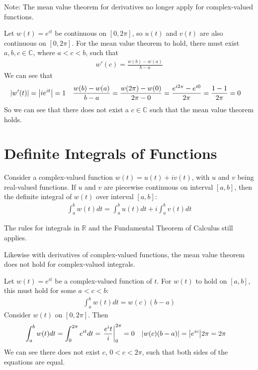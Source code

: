 \documentclass[12pt, english]{book}
\begin{document}
	Note: The mean value theorem for derivatives no longer apply for complex-valued functions. 
	\begin{example}
		Let \(w(t)= e^{it}\) be continuous on \([0, 2\pi]\), so \(u(t)\) and \(v(t)\) are also continuous on \([0,2\pi]\). For the mean value theorem to hold, there must exist \(a, b, c \in \mathbb{C}\), where \(a < c < b\), such that 
		\begin{align*}
			w'(c) = \frac{w(b) - w(a)}{b-a}
		\end{align*}
		We can see that 
		\begin{align*}
			\abs{w'(t)} &= \abs{ie^{it}} = 1 &
			\frac{w(b) - w(a)}{b-a} &= \frac{w(2\pi) - w(0)}{2\pi - 0} = \frac{e^{i2\pi} - e^{i0}}{2\pi} = \frac{1 - 1}{2\pi} = 0
		\end{align*}
		So we can see that there does not exist a \(c \in \mathbb{C}\) such that the mean value theorem holds.
	\end{example}
	
	\section{Definite Integrals of Functions} \label{Definite Integrals of Functions Section - Complex}
	
	\begin{definition}
		\label{Definite Integral of Complex-Valued Function Definition - Complex}
		Consider a complex-valued function \(w(t) = u(t) + iv(t)\), with \(u\) and \(v\) being real-valued functions. If \(u\) and \(v\) are piecewise continuous on interval \([a,b]\), then the definite integral of \(w(t)\) over interval \([a, b]\):
		\begin{align*}
			\int_{a}^{b} w(t) dt = \int_{a}^{b} u(t) dt + i \int_{a}^{b} v(t) dt
		\end{align*}
	\end{definition}
	The rules for integrals in \(\mathbb{R}\) and the Fundamental Theorem of Calculus still applies.
	
	Likewise with derivatives of complex-valued functions, the mean value theorem does not hold for complex-valued integrals. 
	 
	\begin{example}
		Let \(w(t) = e^{it}\) be a complex-valued function of \(t\). For \(w(t)\) to hold on \([a, b]\), this must hold for some \(a < c < b\):
		\begin{align*}
			\int_{a}^{b} w(t) dt = w(c)(b-a)
		\end{align*}
		Consider \(w(t)\) on \([0, 2\pi]\). Then
		\begin{align*}
			\int_{a}^{b} w(t) dt 
			&= \int_{0}^{2\pi} e^{it} dt = \eval{\frac{e^it}{i}}_{0}^{2\pi} = 0 &
			\abs{w(c)(b-a)} &= \abs{e^{ic}} 2 \pi = 2\pi
		\end{align*}
		 We can see there does not exist \(c\), \(0 < c < 2\pi\), such that both sides of the equations are equal. 
	\end{example}
	
\end{document}
